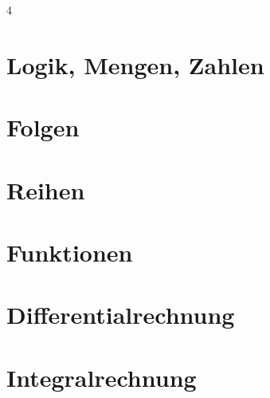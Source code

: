 \documentclass[8pt]{extarticle}
\begin{document}
\begin{multicols*}{4}

\section{Logik, Mengen, Zahlen}



\section{Folgen}



\section{Reihen}



\section{Funktionen}



\section{Differentialrechnung}



\section{Integralrechnung}




\end{multicols*}
\end{document}
